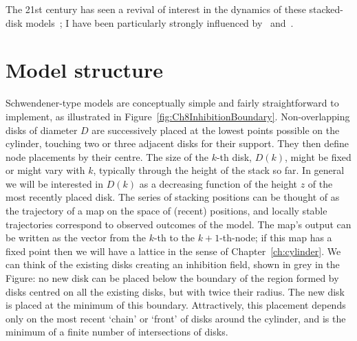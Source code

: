 The 21st century has seen a  revival of interest in the dynamics of these stacked-disk models~\cite{
atelaDynamicalSystemPlant2002,
	atelaRhombicTilingsPrimordia2017,
	hottonPossibleActualPhyllotaxis2006,
	atelaGeometricDynamicEssence2011,adlerConsequencesContactPressure1977,godinPhyllotaxisGeometricCanalization2020};  I have been particularly strongly influenced by~\cite{goleFibonacciQuasisymmetricPhyllotaxis2016} and~\cite{goleConvergenceDiskStacking2020}. 	
	
\clearpage
\section{Model structure}
Schwendener-type models are conceptually simple and fairly straightforward to implement, as illustrated in Figure~\ref{fig:Ch8InhibitionBoundary}.%
Non-overlapping disks of diameter $D$ are successively placed at the lowest points possible on the cylinder,  touching two or three adjacent disks for their support. They then define node placements by their centre. The size of the $k$-th disk, $D(k)$, might be fixed or might vary with $k$, typically through the height of the stack so far.  In general we will be interested in $D(k)$ as a decreasing function of the height $z$ of the most recently placed disk. 
The series of stacking positions can be thought of as the trajectory of a map on the space of (recent) positions, and locally stable trajectories correspond to observed outcomes of the model. The map's output can be written as the vector from the $k$-th to the $k+1$-th-node; if this map has a fixed point then we will have a lattice in the sense of Chapter~\ref{ch:cylinder}. 
%
 We can 
think of the existing disks creating an inhibition field, shown in grey in the Figure: no new disk can be placed below the boundary of the region formed by disks centred on all the existing disks, but with twice their radius. The new disk is placed at the minimum of this boundary.  Attractively, this placement depends only on the most recent `chain' or `front' of disks around the cylinder, and is the minimum of a finite number of intersections of disks.

\clearpage
